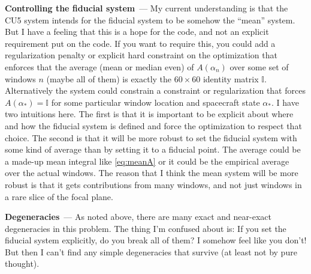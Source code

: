\documentclass[11pt]{article}
\renewcommand{\paragraph}[1]{\medskip\par\noindent\textbf{#1}~---}
\begin{document}
\paragraph{Controlling the fiducial system}
My current understanding is that the CU5 system intends for the fiducial system to be somehow the ``mean'' system.
But I have a feeling that this is a hope for the code, and not an explicit requirement put on the code.
If you want to require this, you could add a regularization penalty or explicit hard constraint on the optimization that enforces that the average (mean or median even) of $A(\alpha_n)$ over some set of windows $n$ (maybe all of them) is exactly the $60\times 60$ identity matrix $\mathbb{I}$.
Alternatively the system could constrain a constraint or regularization that forces $A(\alpha_\ast)=\mathbb{I}$ for some particular window location and spacecraft state $\alpha_\ast$.
I have two intuitions here.
The first is that it is important to be explicit about where and how the fiducial system is defined and force the optimization to respect that choice.
The second is that it will be more robust to set the fiducial system with some kind of average than by setting it to a fiducial point.
The average could be a made-up mean integral like \eqref{eq:meanA} or it could be the empirical average over the actual windows.
The reason that I think the mean system will be more robust is that it gets contributions from many windows, and not just windows in a rare slice of the focal plane.

\paragraph{Degeneracies}
As noted above, there are many exact and near-exact degeneracies in this problem.
The thing I'm confused about is: If you set the fiducial system explicitly, do you break all of them?
I somehow feel like you don't!
But then I can't find any simple degeneracies that survive (at least not by pure thought).
\end{document}
